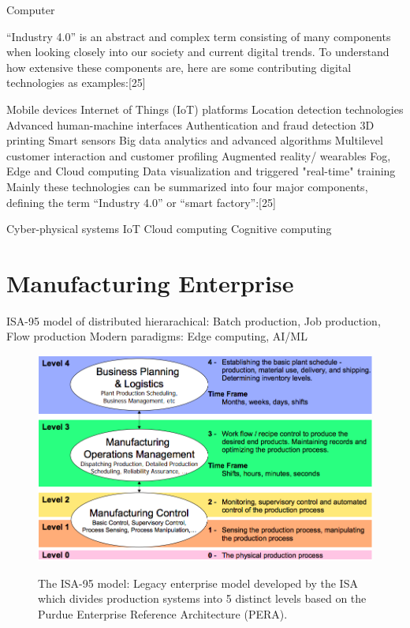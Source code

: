 {Computer

“Industry 4.0” is an abstract and complex term consisting of many components when looking closely into our society and current digital trends. To understand how extensive these components are, here are some contributing digital technologies as examples:[25]

Mobile devices
Internet of Things (IoT) platforms
Location detection technologies
Advanced human-machine interfaces
Authentication and fraud detection
3D printing
Smart sensors
Big data analytics and advanced algorithms
Multilevel customer interaction and customer profiling
Augmented reality/ wearables
Fog, Edge and Cloud computing
Data visualization and triggered "real-time" training
Mainly these technologies can be summarized into four major components, defining the term “Industry 4.0” or “smart factory”:[25]

Cyber-physical systems
IoT
Cloud computing
Cognitive computing

\section{Manufacturing Enterprise}
ISA-95 model of distributed hierarachical: Batch production, Job production, Flow production
Modern paradigms: Edge computing, AI/ML


\begin{figure}[!tbp]
	\begin{center}
		\includegraphics[width=\textwidth]{./chapter-intro/images/intro/isa95-2.png}
		\label{fig:intro:isa95}
		\caption{The ISA-95 model: Legacy enterprise model developed by the ISA which divides production systems into 5 distinct levels based on the Purdue Enterprise Reference Architecture (PERA).}
	\end{center}
\end{figure}

}
